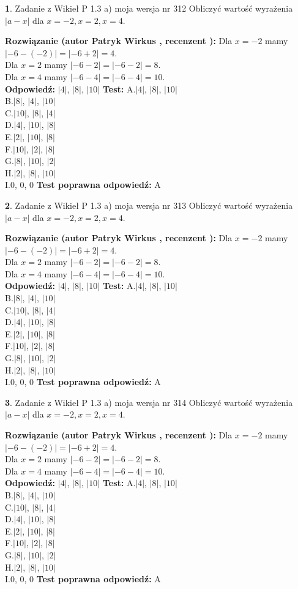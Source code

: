 \documentclass[12pt, a4paper]{article}
\theoremstyle{definition} %
\newtheorem{zad}{}
\newcommand{\zadStart}[1]{\begin{zad}#1\newline}
\newcommand{\zadStop}{\end{zad}}
\newcommand{\rozwStart}[2]{\noindent \textbf{Rozwiązanie (autor #1 , recenzent #2): }\newline}
\newcommand{\rozwStop}{\newline}
\newcommand{\odpStart}{\noindent \textbf{Odpowiedź:}\newline}
\newcommand{\odpStop}{\newline}
\newcommand{\testStart}{\noindent \textbf{Test:}\newline}
\newcommand{\testStop}{\newline}
\newcommand{\kluczStart}{\noindent \textbf{Test poprawna odpowiedź:}\newline}
\newcommand{\kluczStop}{\newline}
\begin{document}
\zadStart{Zadanie z Wikieł P 1.3 a) moja wersja nr 312}
Obliczyć wartość wyrażenia $|a - x|$ dla $x=-2,x=2,x=4$.
\zadStop
\rozwStart{Patryk Wirkus}{}
Dla $x = -2$ mamy $|-6 - (-2)| = |-6 + 2| = 4$.\\
Dla $x = 2$ mamy $|-6 - 2| = |-6 - 2| = 8$.\\
Dla $x = 4$ mamy $|-6 - 4| = |-6 - 4| = 10$.\\
\rozwStop
\odpStart
$|4|$, $|8|$, $|10|$
\odpStop
\testStart
A.$|4|$, $|8|$, $|10|$\\
B.$|8|$, $|4|$, $|10|$\\
C.$|10|$, $|8|$, $|4|$\\
D.$|4|$, $|10|$, $|8|$\\
E.$|2|$, $|10|$, $|8|$\\
F.$|10|$, $|2|$, $|8|$\\
G.$|8|$, $|10|$, $|2|$\\
H.$|2|$, $|8|$, $|10|$\\
I.$0$, $0$, $0$
\testStop
\kluczStart
A
\kluczStop



\zadStart{Zadanie z Wikieł P 1.3 a) moja wersja nr 313}
Obliczyć wartość wyrażenia $|a - x|$ dla $x=-2,x=2,x=4$.
\zadStop
\rozwStart{Patryk Wirkus}{}
Dla $x = -2$ mamy $|-6 - (-2)| = |-6 + 2| = 4$.\\
Dla $x = 2$ mamy $|-6 - 2| = |-6 - 2| = 8$.\\
Dla $x = 4$ mamy $|-6 - 4| = |-6 - 4| = 10$.\\
\rozwStop
\odpStart
$|4|$, $|8|$, $|10|$
\odpStop
\testStart
A.$|4|$, $|8|$, $|10|$\\
B.$|8|$, $|4|$, $|10|$\\
C.$|10|$, $|8|$, $|4|$\\
D.$|4|$, $|10|$, $|8|$\\
E.$|2|$, $|10|$, $|8|$\\
F.$|10|$, $|2|$, $|8|$\\
G.$|8|$, $|10|$, $|2|$\\
H.$|2|$, $|8|$, $|10|$\\
I.$0$, $0$, $0$
\testStop
\kluczStart
A
\kluczStop



\zadStart{Zadanie z Wikieł P 1.3 a) moja wersja nr 314}
Obliczyć wartość wyrażenia $|a - x|$ dla $x=-2,x=2,x=4$.
\zadStop
\rozwStart{Patryk Wirkus}{}
Dla $x = -2$ mamy $|-6 - (-2)| = |-6 + 2| = 4$.\\
Dla $x = 2$ mamy $|-6 - 2| = |-6 - 2| = 8$.\\
Dla $x = 4$ mamy $|-6 - 4| = |-6 - 4| = 10$.\\
\rozwStop
\odpStart
$|4|$, $|8|$, $|10|$
\odpStop
\testStart
A.$|4|$, $|8|$, $|10|$\\
B.$|8|$, $|4|$, $|10|$\\
C.$|10|$, $|8|$, $|4|$\\
D.$|4|$, $|10|$, $|8|$\\
E.$|2|$, $|10|$, $|8|$\\
F.$|10|$, $|2|$, $|8|$\\
G.$|8|$, $|10|$, $|2|$\\
H.$|2|$, $|8|$, $|10|$\\
I.$0$, $0$, $0$
\testStop
\kluczStart
A
\kluczStop
\end{document}
